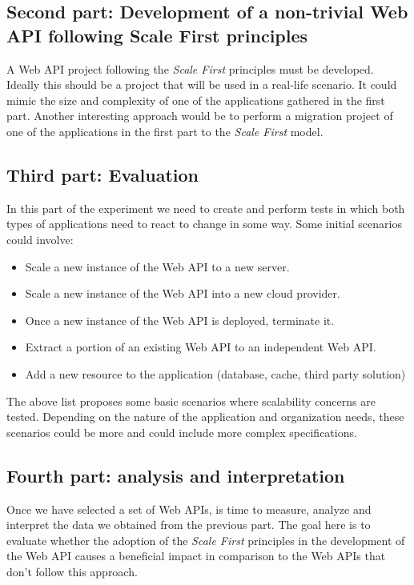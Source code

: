 \documentclass[10pt,article]{IEEEtran}
\begin{document}
\subsection{Second part: Development of a non-trivial Web API following Scale First principles}
A Web API project following the \textit{Scale First} principles must be developed. Ideally this should be a project that will be used in a real-life scenario. It could mimic the size and complexity of one of the applications gathered in the first part. Another interesting approach would be to perform a migration project of one of the applications in the first part to the \textit{Scale First} model.

\subsection{Third part: Evaluation}
In this part of the experiment we need to create and perform tests in which both types of applications need to react to change in some way. Some initial scenarios could involve:

\begin{itemize}
    \item
    Scale a new instance of the Web API to a new server.
    \item
    Scale a new instance of the Web API into a new cloud provider.
    \item
    Once a new instance of the Web API is deployed, terminate it.
    \item
    Extract a portion of an existing Web API to an independent Web API.
    \item
    Add a new resource to the application (database, cache, third party solution)
\end{itemize}

The above list proposes some basic scenarios where scalability concerns are tested. Depending on the nature of the application and organization needs, these scenarios could be more and could include more complex specifications.

\subsection{Fourth part: analysis and interpretation}
Once we have selected a set of Web APIs, is time to measure, analyze and interpret the data we obtained from the previous part. The goal here is to evaluate whether the adoption of the \textit{Scale First} principles in the development of the Web API causes a beneficial impact in comparison to the Web APIs that don't follow this approach.
\end{document}

